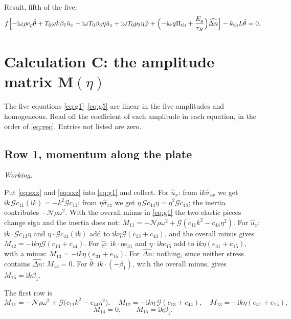 \documentclass[11pt,a4paper]{article}
\newif\ifshowworked \showworkedtrue
\newenvironment{worked}{\ifshowworked\par\smallskip\noindent\textit{Working.}\par\else\setbox0\vbox\bgroup\fi}{\ifshowworked\par\smallskip\else\egroup\fi}
\newcommand{\Nc}{\mathcal{N}}
\newcommand{\Gc}{\mathcal{G}}
\newcommand{\Pth}{\Pi_{\mathrm{th}}}
\newcommand{\ii}{\mathrm{i}}
\newcommand{\bx}{\hat u_x}
\newcommand{\bz}{\hat u_z}
\newcommand{\bp}{\hat\varphi}
\newcommand{\bn}{\widehat{\Delta n}}
\newcommand{\bt}{\hat\theta}
\newcommand{\kB}{k_{\mathrm{th}}}
\begin{document}
\noindent Result, fifth of the five:
\begin{equation}\label{eq:g5}
f\Bigl[-\ii\omega\rho c_p\bt+T_0\omega k\beta_1\bx-\ii\omega T_0\beta_3\eta\bz
+\ii\omega T_0p_3\eta\bp+\Bigl(-\ii\omega q\Pth+\frac{E_g}{\tau_R}\Bigr)\bn\Bigr]-\kB L\bt=0 .
\end{equation}

\section{Calculation C: the amplitude matrix $\mathbf M(\eta)$}\label{sec:C}

The five equations \eqref{eq:g1}--\eqref{eq:g5} are linear in the five amplitudes and homogeneous. Read off
the coefficient of each amplitude in each equation, in the order of \eqref{eq:vec}. Entries not listed are
zero.

\subsection{Row 1, momentum along the plate}

\begin{worked}
Put \eqref{eq:sxx} and \eqref{eq:sxz} into \eqref{eq:g1} and collect.
For $\bx$: from $\ii k\hat\sigma_{xx}$ we get $\ii k\,\Gc c_{11}(\ii k)=-k^2\Gc c_{11}$; from
$\eta\hat\sigma_{xz}$ we get $\eta\,\Gc c_{44}\eta=\eta^2\Gc c_{44}$; the inertia contributes
$-\Nc\rho\omega^2$. With the overall minus in \eqref{eq:g1} the two elastic pieces change sign and the
inertia does not: $M_{11}=-\Nc\rho\omega^2+\Gc(c_{11}k^2-c_{44}\eta^2)$.
For $\bz$: $\ii k\cdot\Gc c_{13}\eta$ and $\eta\cdot\Gc c_{44}(\ii k)$ add to $\ii k\eta\Gc(c_{13}+c_{44})$,
and the overall minus gives $M_{12}=-\ii k\eta\Gc(c_{13}+c_{44})$.
For $\bp$: $\ii k\cdot\eta e_{31}$ and $\eta\cdot\ii k e_{15}$ add to $\ii k\eta(e_{31}+e_{15})$, with a minus:
$M_{13}=-\ii k\eta(e_{31}+e_{15})$.
For $\bn$: nothing, since neither stress contains $\bn$: $M_{14}=0$.
For $\bt$: $\ii k\cdot(-\beta_1)$, with the overall minus, gives $M_{15}=\ii k\beta_1$.
\end{worked}

\noindent The first row is
\begin{equation}\label{eq:row1}
M_{11}=-\Nc\rho\omega^2+\Gc\bigl(c_{11}k^2-c_{44}\eta^2\bigr),\quad
M_{12}=-\ii k\eta\,\Gc(c_{13}+c_{44}),\quad
M_{13}=-\ii k\eta(e_{31}+e_{15}),
\end{equation}
\begin{equation}\label{eq:row1b}
M_{14}=0,\qquad M_{15}=\ii k\beta_1 .
\end{equation}
\end{document}
